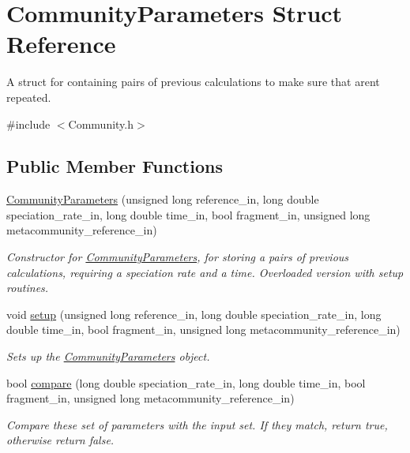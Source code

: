 \hypertarget{struct_community_parameters}{}\section{Community\+Parameters Struct Reference}
\label{struct_community_parameters}


A struct for containing pairs of previous calculations to make sure that aren\textquotesingle{}t repeated.  




{\ttfamily \#include $<$Community.\+h$>$}

\subsection*{Public Member Functions}
\begin{DoxyCompactItemize}
\item 
\hyperlink{struct_community_parameters_a35ba4287722675bea972392eaecace5d}{Community\+Parameters} (unsigned long reference\+\_\+in, long double speciation\+\_\+rate\+\_\+in, long double time\+\_\+in, bool fragment\+\_\+in, unsigned long metacommunity\+\_\+reference\+\_\+in)
\begin{DoxyCompactList}\small\item\em Constructor for \hyperlink{struct_community_parameters}{Community\+Parameters}, for storing a pairs of previous calculations, requiring a speciation rate and a time. Overloaded version with setup routines. \end{DoxyCompactList}\item 
void \hyperlink{struct_community_parameters_a76bcfc1686e2719af641a6c1854665e7}{setup} (unsigned long reference\+\_\+in, long double speciation\+\_\+rate\+\_\+in, long double time\+\_\+in, bool fragment\+\_\+in, unsigned long metacommunity\+\_\+reference\+\_\+in)
\begin{DoxyCompactList}\small\item\em Sets up the \hyperlink{struct_community_parameters}{Community\+Parameters} object. \end{DoxyCompactList}\item 
bool \hyperlink{struct_community_parameters_ab7c20d61446281ce145a65342fdf9ebc}{compare} (long double speciation\+\_\+rate\+\_\+in, long double time\+\_\+in, bool fragment\+\_\+in, unsigned long metacommunity\+\_\+reference\+\_\+in)
\begin{DoxyCompactList}\small\item\em Compare these set of parameters with the input set. If they match, return true, otherwise return false. \end{DoxyCompactList}\item 

\end{DoxyCompactItemize}

